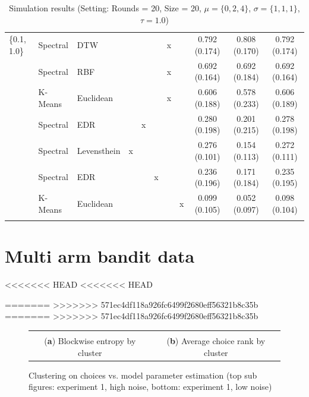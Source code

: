 \documentclass[12pt,a4paper,bibliography=totocnumbered,listof=totocnumbered]{scrartcl}
\begin{document}
{\begin{appendix}
\begin{table}[H]
\begin{tabularx}{\textwidth}{ lllcccccccc}
\{0.1, 1.0\} & Spectral  & DTW &  &  &  & x &  & 0.792 (0.174) & 0.808 (0.170) & 0.792 (0.174) \\ 
& Spectral  & RBF &  &  &  & x &  & 0.692 (0.164) & 0.692 (0.184) & 0.692 (0.164) \\ 
& K-Means & Euclidean  &  &  &  & x &  & 0.606 (0.188) & 0.578 (0.233) & 0.606 (0.189) \\ 
& Spectral  & EDR &  & x &  &  &  & 0.280 (0.198) & 0.201 (0.215) & 0.278 (0.198) \\ 
& Spectral  & Levensthein & x &  &  &  &  & 0.276 (0.101) & 0.154 (0.113) & 0.272 (0.111) \\ 
& Spectral  & EDR &  &  & x &  &  & 0.236 (0.196) & 0.171 (0.184) & 0.235 (0.195) \\ 
& K-Means & Euclidean  &  &  &  &  & x & 0.099 (0.105) & 0.052 (0.097) & 0.098 (0.104) \\ 
\hline \\[-1.8ex] 
	\end{tabularx} 
	\caption{Simulation results (Setting: Rounds = 20, Size = 20, $\mu = \{0,2,4\}$, $\sigma =  \{1,1,1\}$, $\tau = 1.0$)} 
		\label{tab:apstab8}
\end{table} 

\section{Multi arm bandit data}
<<<<<<< HEAD
<<<<<<< HEAD

=======
>>>>>>> 571ec4df118a926fc6499f2680eff56321b8c35b
=======
>>>>>>> 571ec4df118a926fc6499f2680eff56321b8c35b

\begin{figure}[H]
	\centering
	\small
	\hspace*{-0.7in}
	\begin{tabular}{cc}
		 &  \\
		(\textbf{a}) Blockwise entropy by cluster & (\textbf{b}) Average choice rank by cluster \\
	\end{tabular} \quad
	\caption{Clustering on choices vs. model parameter estimation (top sub figures: experiment 1, high noise, bottom: experiment 1, low noise)}
	\label{fig:cluse1c3}
\end{figure}



\end{appendix}}
\end{document}

